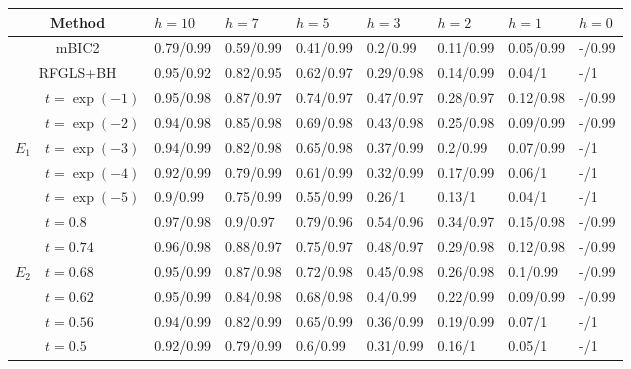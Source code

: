 \begin{sidewaystable}
\centering
\begin{scriptsize}
    \begin{tabular}{c|l|lllllll}
    \hline
    \multicolumn{2}{c|}{Method}          & $h = 10$    & $h = 7$     & $h = 5$     & $h = 3$     & $h = 2$     & $h = 1$     & $h = 0$     \\ \hline
    \multicolumn{2}{c|}{mBIC2}           & 0.79/0.99 & 0.59/0.99 & 0.41/0.99 & 0.2/0.99  & 0.11/0.99 & 0.05/0.99 & -/0.99 \\
    \multicolumn{2}{c|}{RFGLS+BH}        & 0.95/0.92 & 0.82/0.95 & 0.62/0.97 & 0.29/0.98 & 0.14/0.99 & 0.04/1    & -/1       \\ \hline
    ~        & $t = \exp(-1)$ & 0.95/0.98 & 0.87/0.97 & 0.74/0.97 & 0.47/0.97 & 0.28/0.97 & 0.12/0.98 & -/0.99 \\
    ~        & $t = \exp(-2)$ & 0.94/0.98 & 0.85/0.98 & 0.69/0.98 & 0.43/0.98 & 0.25/0.98 & 0.09/0.99 & -/0.99 \\
    $E_1$    & $t = \exp(-3)$ & 0.94/0.99 & 0.82/0.98 & 0.65/0.98 & 0.37/0.99 & 0.2/0.99  & 0.07/0.99 & -/1       \\
    ~        & $t = \exp(-4)$ & 0.92/0.99 & 0.79/0.99 & 0.61/0.99 & 0.32/0.99 & 0.17/0.99 & 0.06/1    & -/1       \\
    ~        & $t = \exp(-5)$ & 0.9/0.99  & 0.75/0.99 & 0.55/0.99 & 0.26/1    & 0.13/1    & 0.04/1    & -/1       \\ \hline
    ~        & $t = 0.8$    & 0.97/0.98 & 0.9/0.97  & 0.79/0.96 & 0.54/0.96 & 0.34/0.97 & 0.15/0.98 & -/0.99 \\
    ~        & $t = 0.74$   & 0.96/0.98 & 0.88/0.97 & 0.75/0.97 & 0.48/0.97 & 0.29/0.98 & 0.12/0.98 & -/0.99 \\
    $E_2$    & $t = 0.68$   & 0.95/0.99 & 0.87/0.98 & 0.72/0.98 & 0.45/0.98 & 0.26/0.98 & 0.1/0.99  & -/0.99 \\
    ~        & $t = 0.62$   & 0.95/0.99 & 0.84/0.98 & 0.68/0.98 & 0.4/0.99  & 0.22/0.99 & 0.09/0.99 & -/0.99    \\
    ~        & $t = 0.56$   & 0.94/0.99 & 0.82/0.99 & 0.65/0.99 & 0.36/0.99 & 0.19/0.99 & 0.07/1    & -/1       \\
    ~        & $t = 0.5$    & 0.92/0.99 & 0.79/0.99 & 0.6/0.99  & 0.31/0.99 & 0.16/1    & 0.05/1    & -/1       \\ \hline
    \end{tabular}
    

\end{scriptsize}
\end{sidewaystable}

